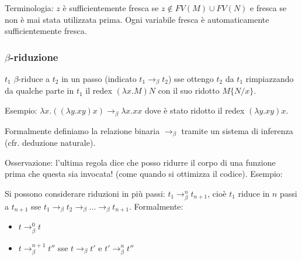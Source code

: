 \documentclass{article}
\begin{document}
Terminologia: $z$ è {\color{red}sufficientemente fresca} se $z \not\in FV(M) \cup FV(N)$ e {\color{red}fresca} se non è mai stata utilizzata
prima. Ogni variabile fresca è automaticamente sufficientemente fresca.

\subsubsection{$\beta$-riduzione}
$t_1$ {\color{red}$\beta$-riduce} a $t_2$ {\color{red}in un passo} (indicato {\color{red}$t_1 \to_\beta t_2$}) sse ottengo $t_2$ da $t_1$ rimpiazzando da qualche parte in $t_1$ il redex $(\lambda x.M)N$ con il suo {\color{red}ridotto} $M\{N/x\}$.

\bigskip

Esempio: $\lambda x.((\lambda y.xy)x) \to_\beta \lambda x.xx$ dove è stato ridotto il redex $(\lambda y.xy)x$.

\bigskip

Formalmente definiamo la relazione binaria $\to_\beta$ tramite un {\color{red}sistema di inferenza} (cfr. deduzione naturale).

\bigskip


\bigskip


\bigskip


\bigskip


\bigskip

Osservazione: l'ultima regola dice che posso ridurre il corpo di una funzione prima che questa sia invocata! (come quando si ottimizza il codice). Esempio:

\bigskip


\bigskip

Si possono considerare riduzioni in più passi: $t_1 \to_\beta^n t_{n+1}$, cioè {\color{red}$t_1$ riduce in $n$ passi a $t_{n+1}$} sse $t_1 \to_\beta t_2\to_\beta ... \to_\beta t_{n+1}$. Formalmente:
\begin{itemize}
    \item $t \to_\beta^0 t$
    \item $t \to_\beta^{n+1} t''$ sse $t\to_\beta t'$ e $t'\to_\beta^n t''$
\end{itemize}
\end{document}
